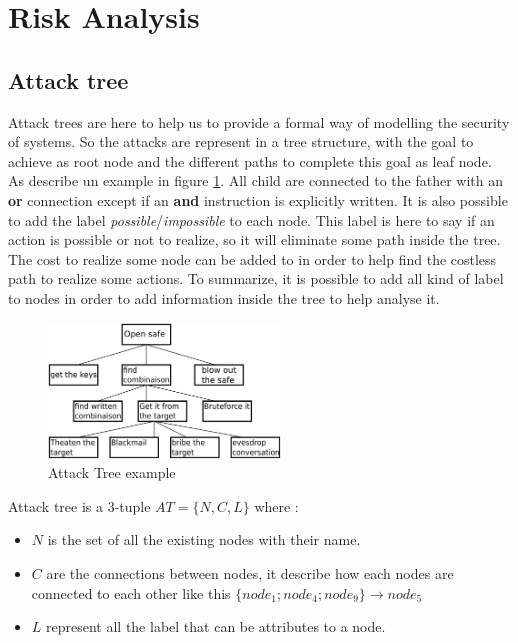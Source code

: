 \newpage
\section {Risk Analysis}



\subsection{Attack tree}

{\Huge A}ttack trees are here to help us to provide a formal way of modelling
the security of systems. So the attacks are represent in a tree
structure, with the goal to achieve as root node and the different
paths to complete this goal as leaf node. As describe un example in
figure \ref{attack}. All child are connected to the father with an
\textbf{or} connection except if an \textbf{and} instruction is explicitly
written. \newline
It is also possible to add the label \emph{possible}/\emph{impossible} to each
node. This label is here to say if an action is possible or not to
realize, so it will eliminate some path inside the tree. \newline
The cost to realize some node can be added to in order to help find
the costless path to realize some actions. \newline
To summarize, it is possible to add all kind of label to nodes in
order to add information inside the tree to help analyse it.

\begin{figure}[h]
    \centering
	\includegraphics[width=0.55\textwidth]{schema/attack_tree.pdf}
    \caption{Attack Tree example}
    \label{attack}
\end{figure}

Attack tree is a 3-tuple $AT = \{N, C, L\}$ where :

\begin{itemize}

\item $N$ is the set of all the existing nodes with their name.

\item $C$ are the connections between nodes, it describe how each nodes
  are connected to each other like this $\{node_1; node_4; node_9\} \rightarrow
  node_5$

\item $L$ represent all the label that can be attributes to a node.

\end{itemize}

